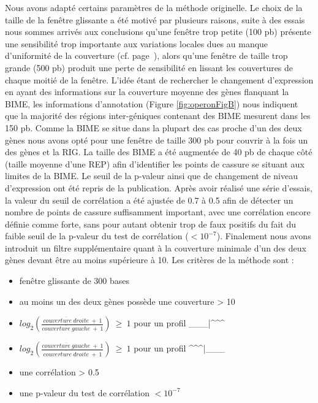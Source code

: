 \documentclass[12pt,a4paper]{report}
\begin{document}
\begin{onehalfspace}
Nous avons adapté certains paramètres de la méthode originelle. Le choix de la taille de la fenêtre glissante a été motivé par plusieurs raisons, suite à des essais nous sommes arrivés aux conclusions qu'une fenêtre trop petite (100 pb) présente une sensibilité trop importante aux variations locales dues au manque d'uniformité de la couverture (cf. page~\pageref{uniformite_couverture}), alors qu'une fenêtre de taille trop grande (500 pb) produit une perte de sensibilité en lissant les couvertures de chaque moitié de la fenêtre. L'idée étant de rechercher le changement d'expression en ayant des informations sur la couverture moyenne des gènes flanquant la BIME, les informations d'annotation (Figure \autoref{fig:operonFigB}) nous indiquent que la majorité des régions inter-géniques contenant des BIME mesurent dans les 150 pb. Comme la BIME se situe dans la plupart des cas proche d'un des deux gènes nous avons opté pour une fenêtre de taille 300 pb pour couvrir à la fois un des gènes et la RIG. La taille des BIME a été augmentée de 40 pb de chaque côté (taille moyenne d'une REP) afin d'identifier les points de cassure se situant aux limites de la BIME. Le seuil de la p-valeur ainsi que de changement de niveau d'expression ont été repris de la publication. Après avoir réalisé une série d'essais, la valeur du seuil de corrélation a été ajustée de 0.7 à 0.5 afin de détecter un nombre de points de cassure suffisamment important, avec une corrélation encore définie comme forte, sans pour autant obtenir trop de faux positifs du fait du faible seuil de la p-valeur du test de corrélation ($< 10^{-7}$). Finalement nous avons introduit un filtre supplémentaire quant à la couverture minimale d'un des deux gènes devant être au moins supérieure à 10. Les critères de la méthode sont :

\begin{itemize}[label=$\bullet$]
\item fenêtre glissante de 300 bases
\item au moins un des deux gènes possède une couverture > 10
\item $log_2(\frac{\overline{couverture~droite}~+~1}{\overline{couverture~gauche}~+~1})~\geq~1$ pour un profil \_\_\_|\^{ }\^{ }\^{ }
\item $log_2(\frac{\overline{couverture~gauche}~+~1}{\overline{couverture~droite}~+~1})~\geq~1$ pour un profil \^{ }\^{ }\^{ }|\_\_\_
\item une corrélation > 0.5
\item une p-valeur du test de corrélation $< 10^{-7}$
\end{itemize}


\end{onehalfspace}
\end{document}
